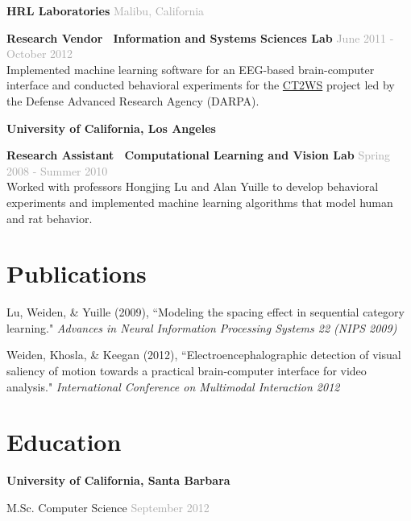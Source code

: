 \documentclass[margin,line]{res}
\newenvironment{list1}{
  \begin{list}{\ding{113}}{%
      \setlength{\itemsep}{0in}
      \setlength{\parsep}{0in} \setlength{\parskip}{0in}
      \setlength{\topsep}{0in} \setlength{\partopsep}{0in}
      \setlength{\leftmargin}{0.17in}}}{\end{list}}
\begin{document}
\begin{resume}
{\bf HRL Laboratories} \hfill \hfill \textcolor{darkgray}{Malibu, California}\\
\begin{list1}
\item[] {\bf Research Vendor \textbar \, Information and Systems Sciences Lab} \hfill \textcolor{darkgray}{June 2011 - October 2012} \vspace{1mm}\\
Implemented machine learning software for an EEG-based brain-computer interface and conducted behavioral experiments for the \href{https://en.wikipedia.org/wiki/Cognitive_Technology_Threat_Warning_System}{CT2WS} project led by the Defense Advanced Research Agency (DARPA).
\end{list1}

{\bf University of California, Los Angeles}\\

\begin{list1}
\item[] {\bf Research Assistant \textbar ~Computational Learning and Vision Lab} \hfill \textcolor{darkgray}{Spring 2008 - Summer 2010} \vspace{1mm}\\
Worked with professors Hongjing Lu and Alan Yuille to develop behavioral experiments and implemented machine learning algorithms that model human and rat behavior.\\
\end{list1}

\section{\sc Publications}
\begin{list1}
\item[] Lu, Weiden, \& Yuille (2009), ``Modeling the spacing effect in sequential category learning." {\em Advances in Neural Information Processing Systems 22 (NIPS 2009)}
\item[] Weiden, Khosla, \& Keegan (2012), ``Electroencephalographic detection of visual saliency of motion towards a practical brain-computer interface for video analysis." {\em International Conference on Multimodal Interaction 2012}
\end{list1}
\nocite{*}
\printbibliography

\section{\sc Education}
{\bf University of California, Santa Barbara}\\
\begin{list1}
\item[] M.Sc. Computer Science \hfill \hfill \textcolor{darkgray}{September 2012}
\end{list1}


\end{resume}
\end{document}

